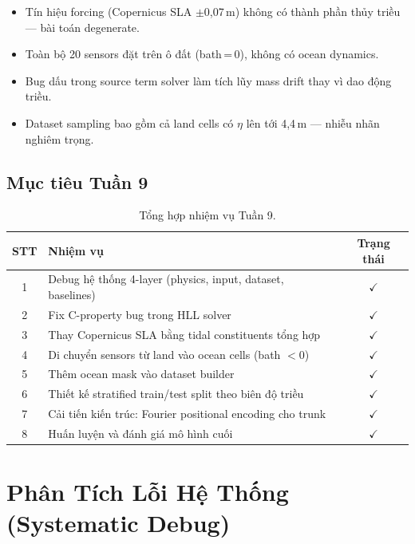 \documentclass[12pt,a4paper]{article}
\begin{document}
\begin{itemize}[nosep]
  \item Tín hiệu forcing (Copernicus SLA $\pm$0,07\,m) không có thành phần thủy triều --- bài toán degenerate.
  \item Toàn bộ 20 sensors đặt trên ô đất (bath\,=\,0), không có ocean dynamics.
  \item Bug dấu trong source term solver làm tích lũy mass drift thay vì dao động triều.
  \item Dataset sampling bao gồm cả land cells có $\eta$ lên tới 4,4\,m --- nhiễu nhãn nghiêm trọng.
\end{itemize}

\subsection{Mục tiêu Tuần 9}

\begin{table}[ht]
  \centering
  \caption{Tổng hợp nhiệm vụ Tuần 9.}
  \label{tab:tasks}
  \begin{tabular}{@{}clc@{}}
    \toprule
    \textbf{STT} & \textbf{Nhiệm vụ} & \textbf{Trạng thái} \\
    \midrule
    1 & Debug hệ thống 4-layer (physics, input, dataset, baselines) & $\checkmark$ \\
    2 & Fix C-property bug trong HLL solver & $\checkmark$ \\
    3 & Thay Copernicus SLA bằng tidal constituents tổng hợp & $\checkmark$ \\
    4 & Di chuyển sensors từ land vào ocean cells (bath $< 0$) & $\checkmark$ \\
    5 & Thêm ocean mask vào dataset builder & $\checkmark$ \\
    6 & Thiết kế stratified train/test split theo biên độ triều & $\checkmark$ \\
    7 & Cải tiến kiến trúc: Fourier positional encoding cho trunk & $\checkmark$ \\
    8 & Huấn luyện và đánh giá mô hình cuối & $\checkmark$ \\
    \bottomrule
  \end{tabular}
\end{table}

\section{Phân Tích Lỗi Hệ Thống (Systematic Debug)}
\end{document}
